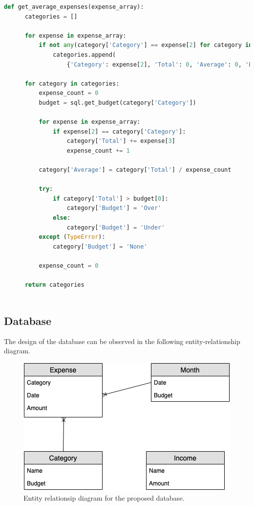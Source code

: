 \documentclass[12pt]{article}
\begin{document}
  \begin{landscape}
    \begin{lstlisting}[language=Python, caption=Source code for \textit{get\_average\_expenses().}, captionpos=b]
      def get_average_expenses(expense_array):
      categories = []

      for expense in expense_array:
          if not any(category['Category'] == expense[2] for category in categories):
              categories.append(
                  {'Category': expense[2], 'Total': 0, 'Average': 0, 'Budget': None})

      for category in categories:
          expense_count = 0
          budget = sql.get_budget(category['Category'])

          for expense in expense_array:
              if expense[2] == category['Category']:
                  category['Total'] += expense[3]
                  expense_count += 1

          category['Average'] = category['Total'] / expense_count

          try:
              if category['Total'] > budget[0]:
                  category['Budget'] = 'Over'
              else:
                  category['Budget'] = 'Under'
          except (TypeError):
              category['Budget'] = 'None'

          expense_count = 0

      return categories
      
    \end{lstlisting}
  \end{landscape}

  \subsection{Database}
  The design of the database can be observed in the following entity-relationship diagram.

  \begin{figure}[H]
    \centering
    \includegraphics[scale=0.7]{database.png}
    \caption{Entity relationsip diagram for the proposed database.}
  \end{figure}
\end{document}
